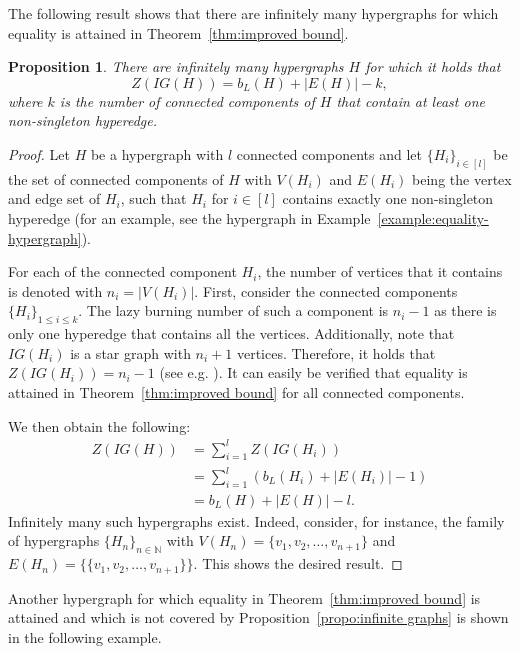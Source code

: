 \documentclass[12pt]{article}
\theoremstyle{plain}
\newtheorem{proposition}[theorem]{Proposition}
\theoremstyle{definition}
\theoremstyle{remark}
\begin{document}
The following result shows that there are infinitely many hypergraphs for which equality is attained in Theorem~\ref{thm:improved bound}. 

\begin{proposition}{}\label{propo:tightnessnewboundburningzeroforcingprocesses}
    There are infinitely many hypergraphs $H$ for which it holds that
    \[ Z(IG(H)) = b_L(H)+|E(H)|-k, \]
    where $k$ is the number of connected components of $H$ that contain at least one non-singleton hyperedge.
    \label{propo:infinite graphs}
\end{proposition}

\begin{proof}
    Let $H$ be a hypergraph with $l$ connected components and let $\{H_i\}_{i\in[l]}$ be the set of connected components of $H$ with $V(H_i)$ and $E(H_i)$ being the vertex and edge set of $H_i$, such that $H_i$ for $i\in [l]$ contains exactly one non-singleton hyperedge (for an example, see the hypergraph in Example~\ref{example:equality-hypergraph}).
    
    For each of the connected component $H_i$, the number of vertices that it contains is denoted with $n_i=|V(H_i)|$. 
    First, consider the connected components $\{H_{i}\}_{1\leq i \leq k}$. The lazy burning number of such a component is $n_i - 1$ as there is only one hyperedge that contains all the vertices. Additionally, note that $IG(H_i)$ is a star graph with $n_i+1$ vertices. Therefore, it holds that $Z(IG(H_i))=n_i - 1$ (see e.g. \cite{hogben2022inverse}).     
    It can easily be verified that equality is attained in Theorem~\ref{thm:improved bound} for all connected components.

    We then obtain the following:
    \begin{align*}
        Z(IG(H)) &= \sum_{i=1}^l Z(IG(H_i))\\
        &= \sum_{i=1}^l (b_L(H_i)+|E(H_i)|-1)\\
        &= b_L(H) + |E(H)| - l.
    \end{align*}
    Infinitely many such hypergraphs exist. Indeed, consider, for instance, the  family of hypergraphs $\{H_n\}_{n\in \mathbb{N}}$ with $V(H_n)=\{ v_1,v_2,\dots, v_{n+1} \}$ and $E(H_n)=\{\{v_1,v_2,\dots, v_{n+1}\}\}$. This shows the desired result.
\end{proof}
Another hypergraph for which equality in Theorem~\ref{thm:improved bound} is attained and which is not covered by Proposition~\ref{propo:infinite graphs} is shown in the following example.
\end{document}
